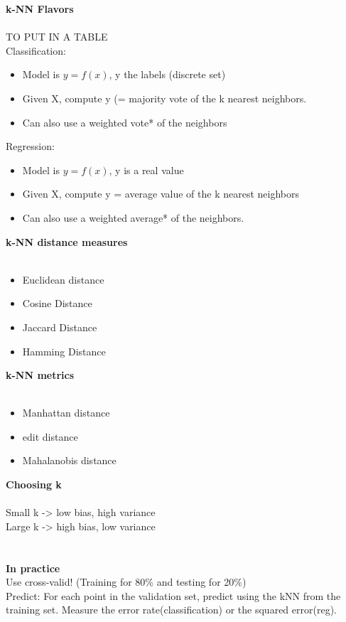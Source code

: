 \textbf{k-NN Flavors}
\\\\
TO PUT IN A TABLE \\
Classification:
\begin{itemize}
 \item Model is $y=f(x)$, y the labels (discrete set)
 \item Given X, compute y (= majority vote of the k nearest neighbors.
 \item Can also use a weighted vote* of the neighbors
\end{itemize}
Regression:
\begin{itemize}
 \item Model is $y=f(x)$, y is a real value
 \item Given X, compute y = average value of the k nearest neighbors
 \item Can also use a weighted average* of the neighbors.
\end{itemize}
\textbf{k-NN distance measures}
\\\\
\begin{itemize}
 \item Euclidean distance
 \item Cosine Distance
 \item Jaccard Distance
 \item Hamming Distance
\end{itemize}
\textbf{k-NN metrics}
\\\\
\begin{itemize}
 \item Manhattan distance
 \item edit distance
 \item Mahalanobis distance
\end{itemize}
\textbf{Choosing k}
\\\\
Small k -> low bias, high variance \\
Large k -> high bias, low variance \\
\\\\
\textbf{In practice}
\\
Use cross-valid! (Training for 80\% and testing for 20\%) \\
Predict: For each point in the validation set, predict using the kNN from the training set. Measure the error rate(classification) or the squared error(reg). \\
